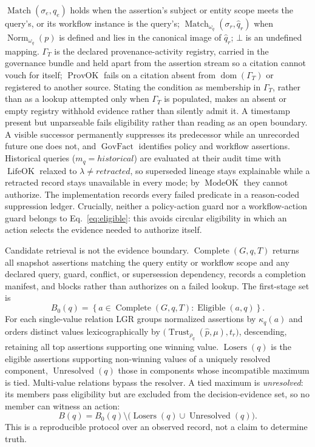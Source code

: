 \documentclass[conference]{IEEEtran}
\newcommand{\lgr}{\textsc{LGR}\xspace}
\newcommand{\set}[1]{\left\{#1\right\}}
\begin{document}
$\operatorname{Match}(\sigma_e,q_e)$ holds when the assertion's subject or entity scope meets the query's, or its workflow instance is the query's; $\operatorname{Match}_{\omega_q}(\sigma_r,\hat q_r)$ when $\operatorname{Norm}_{\omega_q}(p)$ is defined and lies in the canonical image of $\hat q_r$; $\bot$ is an undefined mapping. $\Gamma_T$ is the declared provenance-activity registry, carried in the governance bundle and held apart from the assertion stream so a citation cannot vouch for itself; $\operatorname{ProvOK}$ fails on a citation absent from $\operatorname{dom}(\Gamma_T)$ or registered to another source. Stating the condition as membership in $\Gamma_T$, rather than as a lookup attempted only when $\Gamma_T$ is populated, makes an absent or empty registry withhold evidence rather than silently admit it. A timestamp present but unparseable fails eligibility rather than reading as an open boundary. A visible successor permanently suppresses its predecessor while an unrecorded future one does not, and $\operatorname{GovFact}$ identifies policy and workflow assertions. Historical queries ($m_q=\mathit{historical}$) are evaluated at their audit time with $\operatorname{LifeOK}$ relaxed to $\lambda\neq\mathit{retracted}$, so superseded lineage stays explainable while a retracted record stays unavailable in every mode; by $\operatorname{ModeOK}$ they cannot authorize. The implementation records every failed predicate in a reason-coded suppression ledger. Crucially, neither a policy-action guard nor a workflow-action guard belongs to Eq.~\eqref{eq:eligible}: this avoids circular eligibility in which an action selects the evidence needed to authorize itself.

Candidate retrieval is not the evidence boundary. $\operatorname{Complete}(G,q,T)$ returns all snapshot assertions matching the query entity or workflow scope and any declared query, guard, conflict, or supersession dependency, records a completion manifest, and blocks rather than authorizes on a failed lookup. The first-stage set is
\begin{equation}
B_0(q)=\set{a\in\operatorname{Complete}(G,q,T):\operatorname{Eligible}(a,q)}.
\label{eq:bzero}
\end{equation}
For each single-value relation \lgr groups normalized assertions by $\kappa_q(a)$ and orders distinct values lexicographically by $\bigl(\operatorname{Trust}_{\rho_q}(\hat p,\mu),t_r\bigr)$, descending, retaining all top assertions supporting one winning value. $\operatorname{Losers}(q)$ is the eligible assertions supporting non-winning values of a uniquely resolved component, $\operatorname{Unresolved}(q)$ those in components whose incompatible maximum is tied. Multi-value relations bypass the resolver. A tied maximum is \emph{unresolved}: its members pass eligibility but are excluded from the decision-evidence set, so no member can witness an action:
\begin{equation}
B(q)=B_0(q)\setminus\bigl(\operatorname{Losers}(q)\cup\operatorname{Unresolved}(q)\bigr).
\label{eq:resolved}
\end{equation}
This is a reproducible protocol over an observed record, not a claim to determine truth.
\end{document}

